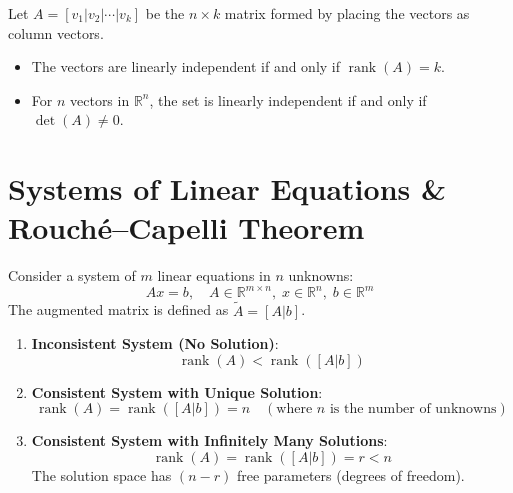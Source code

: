 \begin{theorem}
Let $A = [v_1 | v_2 | \cdots | v_k]$ be the $n \times k$ matrix formed by placing the vectors as column vectors.
\begin{itemize}[leftmargin=1.5em]
    \item The vectors are linearly independent if and only if $\operatorname{rank}(A) = k$.
    \item For $n$ vectors in $\mathbb{R}^n$, the set is linearly independent if and only if $\det(A) \ne 0$.
\end{itemize}
\end{theorem}

\section{Systems of Linear Equations \& Rouch\'e--Capelli Theorem}

Consider a system of $m$ linear equations in $n$ unknowns:
\begin{equation}
Ax = b, \quad A \in \mathbb{R}^{m\times n}, \; x \in \mathbb{R}^n, \; b \in \mathbb{R}^m
\end{equation}
The augmented matrix is defined as $\tilde{A} = [A | b]$.

\begin{theorem}
\begin{enumerate}[leftmargin=1.5em]
    \item \textbf{Inconsistent System (No Solution)}:
    \begin{equation}
    \operatorname{rank}(A) < \operatorname{rank}([A | b])
    \end{equation}
    \item \textbf{Consistent System with Unique Solution}:
    \begin{equation}
    \operatorname{rank}(A) = \operatorname{rank}([A | b]) = n \quad (\text{where } n \text{ is the number of unknowns})
    \end{equation}
    \item \textbf{Consistent System with Infinitely Many Solutions}:
    \begin{equation}
    \operatorname{rank}(A) = \operatorname{rank}([A | b]) = r < n
    \end{equation}
    The solution space has $(n - r)$ free parameters (degrees of freedom).
\end{enumerate}
\end{theorem}

